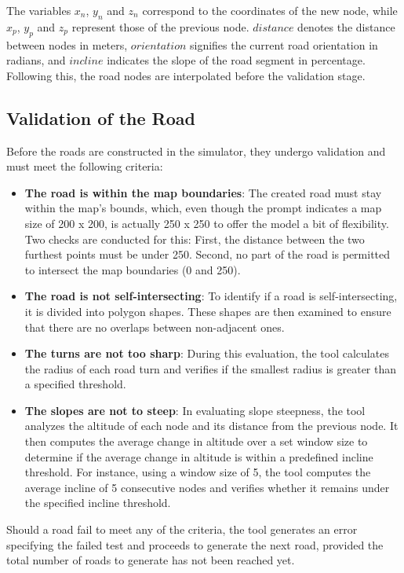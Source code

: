 The variables \(x_n\), \(y_n\) and \(z_n\) correspond to the coordinates of the new node, while \(x_p\), \(y_p\) and \(z_p\) represent those of the previous node. \(distance\) denotes the distance between nodes in meters, \(orientation\)  signifies the current road orientation in radians, and \(incline\) indicates the slope of the road segment in percentage. Following this, the road nodes are interpolated before the validation stage.

\subsection{Validation of the Road}

Before the roads are constructed in the simulator, they undergo validation and must meet the following criteria:

\begin{itemize}
    \item \textbf{The road is within the map boundaries}: The created road must stay within the map's bounds, which, even though the prompt indicates a map size of 200 x 200, is actually 250 x 250 to offer the model a bit of flexibility. Two checks are conducted for this: First, the distance between the two furthest points must be under 250. Second, no part of the road is permitted to intersect the map boundaries (0 and 250).
    \item \textbf{The road is not self-intersecting}: To identify if a road is self-intersecting, it is divided into polygon shapes. These shapes are then examined to ensure that there are no overlaps between non-adjacent ones.
    \item \textbf{The turns are not too sharp}: During this evaluation, the tool calculates the radius of each road turn and verifies if the smallest radius is greater than a specified threshold.
    \item \textbf{The slopes are not to steep}: In evaluating slope steepness, the tool analyzes the altitude of each node and its distance from the previous node. It then computes the average change in altitude over a set window size to determine if the average change in altitude is within a predefined incline threshold. For instance, using a window size of 5, the tool computes the average incline of 5 consecutive nodes and verifies whether it remains under the specified incline threshold.
\end{itemize}

Should a road fail to meet any of the criteria, the tool generates an error specifying the failed test and proceeds to generate the next road, provided the total number of roads to generate has not been reached yet.

